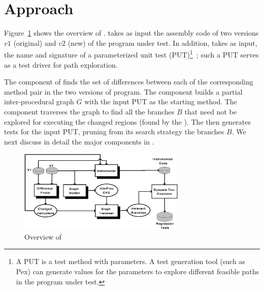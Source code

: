 \section{Approach}
\label{sec:approach}

Figure~\ref{fig:approach} shows the overview of .  takes as input the assembly code of two versions $v1$ (original) and $v2$ (new) of the program under test. In addition,  takes as input, the name and signature of a parameterized unit test (PUT)\footnote{A PUT is a test method with parameters. A test generation tool (such as Pex) can generate values for the parameters to explore different feasible paths in the program under test.}~\cite{tillmann05:parameterized}; such a PUT serves as a test driver for path exploration.
 
The  component of  finds the set of differences between each of the corresponding method pair in the two versions of program. The  component builds a partial inter-procedural graph $G$ with the input PUT as the starting method. The  component traverses the graph to find all the branches $B$ that need not be explored for executing the changed regions (found by the ). The  then generates tests for the input PUT, pruning from its search strategy the branches $B$. We next discuss in detail the major components in .

\begin{figure}[t]
    \centering
        \includegraphics[width=8cm, keepaspectratio]{Figures/appr}
    \caption{Overview of }
    \label{fig:approach}
    
\end{figure}

